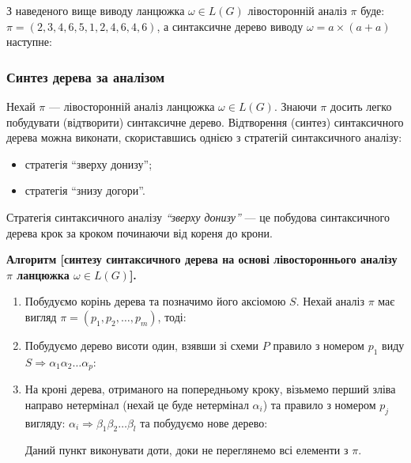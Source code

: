 З наведеного вище виводу ланцюжка $\omega \in L(G)$ лівосторонній аналіз $\pi$ буде: $\pi = (2, 3, 4, 6, 5, 1, 2, 4, 6, 4, 6)$, а синтаксичне дерево виводу $\omega = a \times (a + a)$ наступне:
\begin{figure}[H]
	\centering
	
\end{figure}

\subsubsection{Синтез дерева за аналізом}

Нехай $\pi$ --- лівосторонній аналіз ланцюжка $\omega \in L(G)$. Знаючи $\pi$ досить легко побудувати (відтворити) синтаксичне дерево. Відтворення (синтез) синтаксичного дерева можна виконати, скориставшись однією з стратегій синтаксичного аналізу:
\begin{itemize}
	\item стратегія ``зверху донизу'';
	\item стратегія ``знизу догори''.
\end{itemize}

Стратегія синтаксичного аналізу \textit{``зверху донизу''} --- це побудова синтаксичного дерева крок за кроком починаючи від кореня до крони. \medskip

\textbf{Алгоритм [синтезу синтаксичного дерева на основі лівостороннього аналізу $\pi$ ланцюжка $\omega \in L(G)$].}
\begin{enumerate}
	\item Побудуємо корінь дерева та позначимо його аксіомою $S$. Нехай аналіз $\pi$ має вигляд $\pi = (p_1, p_2, \ldots, p_m)$, тоді:

	\item Побудуємо дерево висоти один, взявши зі схеми $P$ правило з номером $p_1$ виду $S \Rightarrow \alpha_1 \alpha_2 \ldots \alpha_p$:
	\begin{figure}[H]
		\centering
		
	\end{figure}

	\item На кроні дерева, отриманого на попередньому кроку, візьмемо перший зліва направо нетермінал (нехай це буде нетермінал $\alpha_i$) та правило з номером $p_j$ вигляду: $\alpha_i \Rightarrow \beta_1 \beta_2 \ldots \beta_l$ та побудуємо нове дерево:
	\begin{figure}[H]
		\centering
		
	\end{figure}

	Даний пункт виконувати доти, доки не переглянемо всі елементи з $\pi$.
\end{enumerate}

